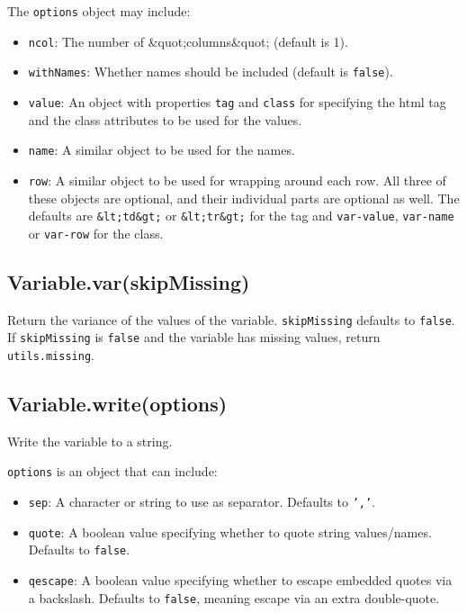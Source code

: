 \documentclass{article}
\begin{document}
The \texttt{options} object may include:


\begin{itemize}

\item \texttt{ncol}: The number of \&quot;columns\&quot; (default is 1).

\item \texttt{withNames}: Whether names should be included (default is \texttt{false}).

\item \texttt{value}: An object with properties \texttt{tag} and \texttt{class} for specifying the
  html tag and the class attributes to be used for the values.

\item \texttt{name}:  A similar object to be used for the names.

\item \texttt{row}:   A similar object to be used for wrapping around each row.
All three of these objects are optional, and their individual parts are
optional as well. The defaults are \texttt{\&lt;td\&gt;} or \texttt{\&lt;tr\&gt;} for the tag and
\texttt{var-value}, \texttt{var-name} or \texttt{var-row} for the class.

\end{itemize}

    \subsection*{Variable.var(skipMissing)}
    Return the variance of the values of the variable.
\texttt{skipMissing} defaults to \texttt{false}.  If \texttt{skipMissing} is \texttt{false} and
the variable has missing values, return \texttt{utils.missing}.


    \subsection*{Variable.write(options)}
    Write the variable to a string.


\texttt{options} is an object that can include:


\begin{itemize}

\item \texttt{sep}: A character or string to use as separator. Defaults to \texttt{','}.

\item \texttt{quote}: A boolean value specifying whether to quote string values/names. Defaults
 to \texttt{false}.

\item \texttt{qescape}: A boolean value specifying whether to escape embedded quotes via a
 backslash. Defaults to \texttt{false}, meaning escape via an extra double-quote.

\end{itemize}
\end{document}
